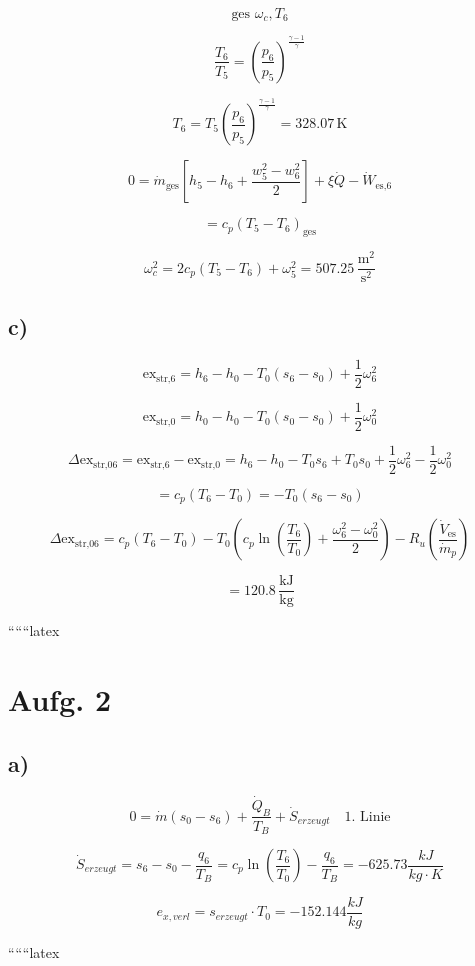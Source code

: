\[
\text{ges } \omega_c, T_6
\]

\[
\frac{T_6}{T_5} = \left( \frac{p_6}{p_5} \right)^{\frac{\gamma-1}{\gamma}}
\]

\[
T_6 = T_5 \left( \frac{p_6}{p_5} \right)^{\frac{\gamma-1}{\gamma}} = 328.07 \, \text{K}
\]

\[
0 = \dot{m}_{\text{ges}} \left[ h_5 - h_6 + \frac{w_5^2 - w_6^2}{2} \right] + \xi \dot{Q} - \dot{W}_{\text{es,6}}
\]

\[
= c_p \left( T_5 - T_6 \right)_{\text{ges}}
\]

\[
\omega_c^2 = 2 c_p (T_5 - T_6) + \omega_5^2 = 507.25 \, \frac{\text{m}^2}{\text{s}^2}
\]

\subsection*{c)}

\[
\text{ex}_{\text{str,6}} = h_6 - h_0 - T_0 (s_6 - s_0) + \frac{1}{2} \omega_6^2
\]

\[
\text{ex}_{\text{str,0}} = h_0 - h_0 - T_0 (s_0 - s_0) + \frac{1}{2} \omega_0^2
\]

\[
\Delta \text{ex}_{\text{str,06}} = \text{ex}_{\text{str,6}} - \text{ex}_{\text{str,0}} = h_6 - h_0 - T_0 s_6 + T_0 s_0 + \frac{1}{2} \omega_6^2 - \frac{1}{2} \omega_0^2
\]

\[
= c_p (T_6 - T_0) = -T_0 (s_6 - s_0)
\]

\[
\Delta \text{ex}_{\text{str,06}} = c_p (T_6 - T_0) - T_0 \left( c_p \ln \left( \frac{T_6}{T_0} \right) + \frac{\omega_6^2 - \omega_0^2}{2} \right) - R_u \left( \frac{\dot{V}_{\text{es}}}{\dot{m}_p} \right)
\]

\[
= 120.8 \, \frac{\text{kJ}}{\text{kg}}
\]

``````latex

\section*{Aufg. 2}

\subsection*{a)}
\begin{equation*}
0 = \dot{m} (s_0 - s_6) + \frac{\dot{Q}_B}{T_B} + \dot{S}_{erzeugt} \quad \text{1. Linie}
\end{equation*}

\begin{equation*}
\dot{S}_{erzeugt} = s_6 - s_0 - \frac{q_6}{T_B} = c_p \ln \left( \frac{T_6}{T_0} \right) - \frac{q_6}{T_B} = -625.73 \frac{kJ}{kg \cdot K}
\end{equation*}

\begin{equation*}
e_{x,verl} = s_{erzeugt} \cdot T_0 = -152.144 \frac{kJ}{kg}
\end{equation*}

``````latex


